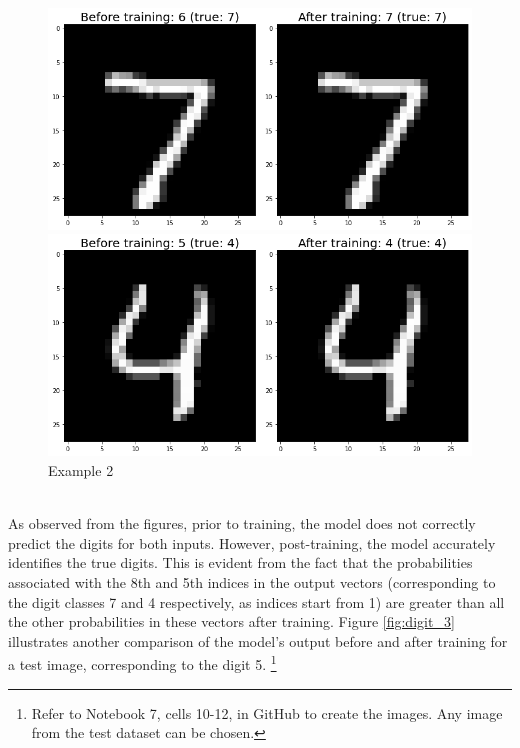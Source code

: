 \begin{figure}[h!]
    \centering
    \begin{minipage}[b]{0.40\textwidth}
      \includegraphics[width=\textwidth]{Pictures/digit_1.png}
      \caption{Example 1}\label{fig:digit_1}
    \end{minipage}
    \hspace{0.3cm}
    \begin{minipage}[b]{0.40\textwidth}
      \includegraphics[width=\textwidth]{Pictures/digit_2.png}
      \caption{Example 2}\label{fig:digit_2}
    \end{minipage}
\end{figure}\\
As observed from the figures, prior to training, the model does not correctly predict the digits for both inputs. However, post-training, the model accurately identifies the true digits. This is evident from the fact that the probabilities associated with the 8th and 5th indices in the output vectors (corresponding to the digit classes 7 and 4 respectively, as indices start from 1) are greater than all the other probabilities in these vectors after training. Figure \ref{fig:digit_3} illustrates another comparison of the model's output before and after training for a test image, corresponding to the digit 5. \footnote{Refer to Notebook 7, cells 10-12, in GitHub \cite{ThesisCode2023} to create the images. Any image from the test dataset can be chosen.}
